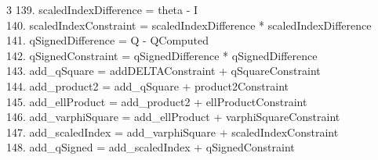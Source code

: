 \documentclass[10pt]{article}
\begin{document}
\begin{multicols}{3}
139. scaledIndexDifference = theta - I\\
140. scaledIndexConstraint = scaledIndexDifference * scaledIndexDifference\\
141. qSignedDifference = Q - QComputed\\
142. qSignedConstraint = qSignedDifference * qSignedDifference\\
143. add\_qSquare = addDELTAConstraint + qSquareConstraint\\
144. add\_product2 = add\_qSquare + product2Constraint\\
145. add\_ellProduct = add\_product2 + ellProductConstraint\\
146. add\_varphiSquare = add\_ellProduct + varphiSquareConstraint\\
147. add\_scaledIndex = add\_varphiSquare + scaledIndexConstraint\\
148. add\_qSigned = add\_scaledIndex + qSignedConstraint\\
\end{multicols}
\end{document}
